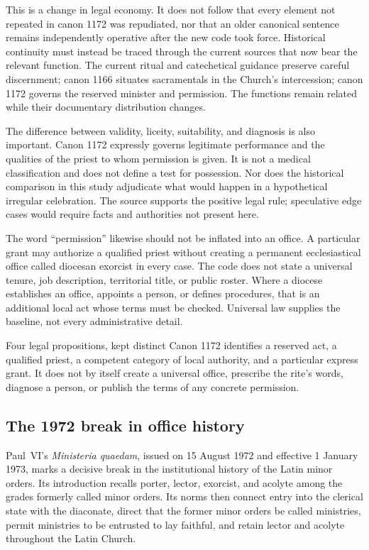 This is a change in legal economy. It does not follow that every element not
repeated in canon 1172 was repudiated, nor that an older canonical sentence
remains independently operative after the new code took force. Historical
continuity must instead be traced through the current sources that now bear
the relevant function. The current ritual and catechetical guidance preserve
careful discernment; canon 1166 situates sacramentals in the Church's
intercession; canon 1172 governs the reserved minister and permission. The
functions remain related while their documentary distribution changes.

The difference between validity, liceity, suitability, and diagnosis is also
important. Canon 1172 expressly governs legitimate performance and the
qualities of the priest to whom permission is given. It is not a medical
classification and does not define a test for possession. Nor does the
historical comparison in this study adjudicate what would happen in a
hypothetical irregular celebration. The source supports the positive legal
rule; speculative edge cases would require facts and authorities not present
here.

The word ``permission'' likewise should not be inflated into an office. A
particular grant may authorize a qualified priest without creating a
permanent ecclesiastical office called diocesan exorcist in every case. The
code does not state a universal tenure, job description, territorial title,
or public roster. Where a diocese establishes an office, appoints a person,
or defines procedures, that is an additional local act whose terms must be
checked. Universal law supplies the baseline, not every administrative detail.

\begin{studybox}{Four legal propositions, kept distinct}
Canon 1172 identifies a reserved act, a qualified priest, a competent category
of local authority, and a particular express grant. It does not by itself
create a universal office, prescribe the rite's words, diagnose a person, or
publish the terms of any concrete permission.
\end{studybox}

\subsection{The 1972 break in office history}

Paul~VI's \emph{Ministeria quaedam}, issued on 15 August 1972 and effective
1 January 1973, marks a decisive break in the institutional history of the
Latin minor orders. Its introduction recalls porter, lector, exorcist, and
acolyte among the grades formerly called minor orders. Its norms then connect
entry into the clerical state with the diaconate, direct that the former minor
orders be called ministries, permit ministries to be entrusted to lay
faithful, and retain lector and acolyte throughout the Latin Church.

